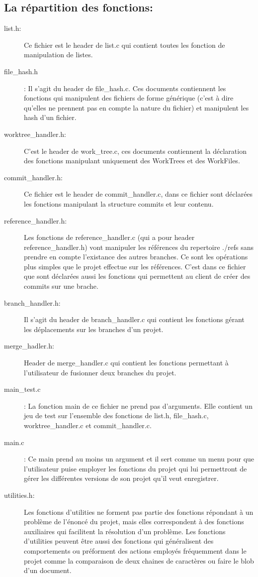 \documentclass[11pt,francais]{article}
\begin{document}
\subsection{La répartition des fonctions:}
\begin{description}
\item[list.h:] Ce fichier est le header de list.c qui contient toutes les fonction de manipulation de listes.
\item[file\_hash.h]: Il s'agit du header de file\_hash.c. Ces documents contiennent les fonctions qui manipulent des fichiers de forme générique (c'est à dire qu'elles ne prennent pas en compte la nature du fichier) et manipulent les hash d'un fichier.
\item[worktree\_handler.h:] C'est le header de work\_tree.c, ces documents contiennent la déclaration des fonctions manipulant uniquement des WorkTrees et des WorkFiles.
\item[commit\_handler.h:]  Ce fichier est le header de commit\_handler.c, dans ce fichier sont déclarées les fonctions manipulant la structure commits et leur contenu.
\item[reference\_handler.h:] Les fonctions de reference\_handler.c (qui a pour header reference\_handler.h) vont manipuler les références du repertoire ./refs sans prendre en compte l'existance des autres branches. Ce sont les opérations plus simples que le projet effectue sur les références. C'est dans ce fichier que sont déclarées aussi les fonctions qui permettent au client de créer des commits sur une brache.
\item[branch\_handler.h:] Il s'agit du header de branch\_handler.c qui contient les fonctions gérant les déplacements sur les branches d'un projet.
\item[merge\_hadler.h:] Header de merge\_handler.c qui contient les fonctions permettant à l'utilisateur de fusionner deux branches du projet.
\item[main\_test.c]: La fonction main de ce fichier ne prend pas d'arguments. Elle contient un jeu de test sur l'ensemble des fonctions de list.h, file\_hash.c, worktree\_handler.c et commit\_handler.c.
\item[main.c]: Ce main prend au moins un argument et il sert comme un menu pour que l'utilisateur puise employer les fonctions du projet qui lui permettront de gérer les différentes versions de son projet qu'il veut enregistrer.
\item[utilities.h:] Les fonctions d'utilities ne forment pas partie des fonctions répondant à un problème de l'énoncé du projet, mais elles correspondent à des fonctions auxiliaires qui facilitent la résolution d'un problème. Les fonctions d'utilities peuvent être aussi  des fonctions qui généralisent des comportements ou préforment des actions employés fréquemment dans le projet comme la comparaison de deux chaines de caractères ou faire le blob d'un document. 
\end{description}
\end{document}
